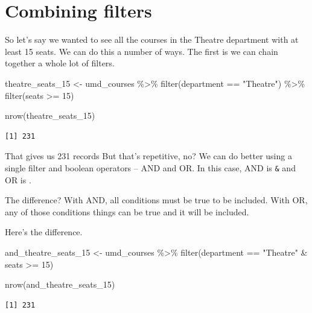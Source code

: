 \documentclass[
  letterpaper,
  DIV=11,
  numbers=noendperiod]{scrreprt}
\newenvironment{Shaded}{\begin{snugshade}}{\end{snugshade}}
\newcommand{\DecValTok}[1]{\textcolor[rgb]{0.68,0.00,0.00}{#1}}
\newcommand{\FunctionTok}[1]{\textcolor[rgb]{0.28,0.35,0.67}{#1}}
\newcommand{\NormalTok}[1]{\textcolor[rgb]{0.00,0.23,0.31}{#1}}
\newcommand{\OtherTok}[1]{\textcolor[rgb]{0.00,0.23,0.31}{#1}}
\newcommand{\SpecialCharTok}[1]{\textcolor[rgb]{0.37,0.37,0.37}{#1}}
\newcommand{\StringTok}[1]{\textcolor[rgb]{0.13,0.47,0.30}{#1}}
\begin{document}
\hypertarget{combining-filters}{%
\section{Combining filters}\label{combining-filters}}

So let's say we wanted to see all the courses in the Theatre department
with at least 15 seats. We can do this a number of ways. The first is we
can chain together a whole lot of filters.

\begin{Shaded}
\begin{Highlighting}[]
\NormalTok{theatre\_seats\_15 }\OtherTok{\textless{}{-}}\NormalTok{ umd\_courses }\SpecialCharTok{\%\textgreater{}\%} \FunctionTok{filter}\NormalTok{(department }\SpecialCharTok{==} \StringTok{"Theatre"}\NormalTok{) }\SpecialCharTok{\%\textgreater{}\%} \FunctionTok{filter}\NormalTok{(seats }\SpecialCharTok{\textgreater{}=} \DecValTok{15}\NormalTok{)}

\FunctionTok{nrow}\NormalTok{(theatre\_seats\_15)}
\end{Highlighting}
\end{Shaded}

\begin{verbatim}
[1] 231
\end{verbatim}

That gives us 231 records But that's repetitive, no? We can do better
using a single filter and boolean operators -- AND and OR. In this case,
AND is \texttt{\&} and OR is \texttt{\textbar{}}.

The difference? With AND, all conditions must be true to be included.
With OR, any of those conditions things can be true and it will be
included.

Here's the difference.

\begin{Shaded}
\begin{Highlighting}[]
\NormalTok{and\_theatre\_seats\_15 }\OtherTok{\textless{}{-}}\NormalTok{ umd\_courses }\SpecialCharTok{\%\textgreater{}\%} \FunctionTok{filter}\NormalTok{(department }\SpecialCharTok{==} \StringTok{"Theatre"} \SpecialCharTok{\&}\NormalTok{ seats }\SpecialCharTok{\textgreater{}=} \DecValTok{15}\NormalTok{)}

\FunctionTok{nrow}\NormalTok{(and\_theatre\_seats\_15)}
\end{Highlighting}
\end{Shaded}

\begin{verbatim}
[1] 231
\end{verbatim}
\end{document}
